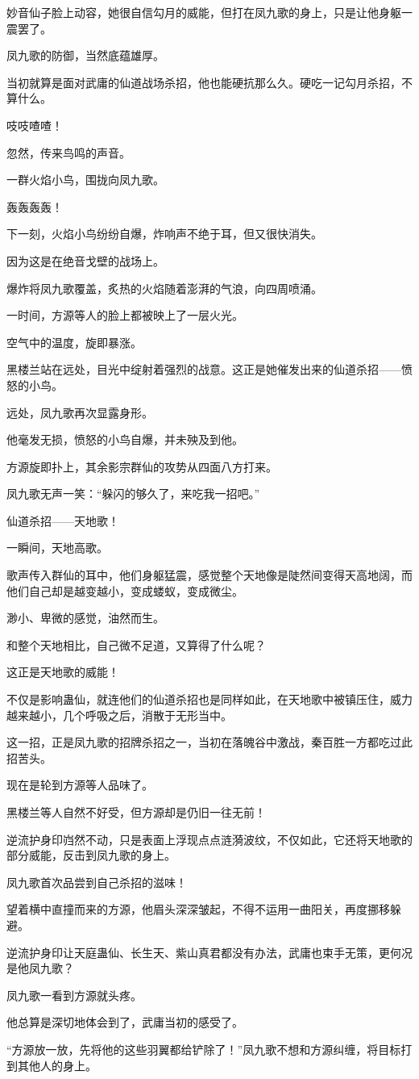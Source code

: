 \begin{this_body}
妙音仙子脸上动容，她很自信勾月的威能，但打在凤九歌的身上，只是让他身躯一震罢了。

凤九歌的防御，当然底蕴雄厚。

当初就算是面对武庸的仙道战场杀招，他也能硬抗那么久。硬吃一记勾月杀招，不算什么。

吱吱喳喳！

忽然，传来鸟鸣的声音。

一群火焰小鸟，围拢向凤九歌。

轰轰轰轰！

下一刻，火焰小鸟纷纷自爆，炸响声不绝于耳，但又很快消失。

因为这是在绝音戈壁的战场上。

爆炸将凤九歌覆盖，炙热的火焰随着澎湃的气浪，向四周喷涌。

一时间，方源等人的脸上都被映上了一层火光。

空气中的温度，旋即暴涨。

黑楼兰站在远处，目光中绽射着强烈的战意。这正是她催发出来的仙道杀招——愤怒的小鸟。

远处，凤九歌再次显露身形。

他毫发无损，愤怒的小鸟自爆，并未殃及到他。

方源旋即扑上，其余影宗群仙的攻势从四面八方打来。

凤九歌无声一笑：“躲闪的够久了，来吃我一招吧。”

仙道杀招——天地歌！

一瞬间，天地高歌。

歌声传入群仙的耳中，他们身躯猛震，感觉整个天地像是陡然间变得天高地阔，而他们自己却是越变越小，变成蝼蚁，变成微尘。

渺小、卑微的感觉，油然而生。

和整个天地相比，自己微不足道，又算得了什么呢？

这正是天地歌的威能！

不仅是影响蛊仙，就连他们的仙道杀招也是同样如此，在天地歌中被镇压住，威力越来越小，几个呼吸之后，消散于无形当中。

这一招，正是凤九歌的招牌杀招之一，当初在落魄谷中激战，秦百胜一方都吃过此招苦头。

现在是轮到方源等人品味了。

黑楼兰等人自然不好受，但方源却是仍旧一往无前！

逆流护身印岿然不动，只是表面上浮现点点涟漪波纹，不仅如此，它还将天地歌的部分威能，反击到凤九歌的身上。

凤九歌首次品尝到自己杀招的滋味！

望着横中直撞而来的方源，他眉头深深皱起，不得不运用一曲阳关，再度挪移躲避。

逆流护身印让天庭蛊仙、长生天、紫山真君都没有办法，武庸也束手无策，更何况是他凤九歌？

凤九歌一看到方源就头疼。

他总算是深切地体会到了，武庸当初的感受了。

“方源放一放，先将他的这些羽翼都给铲除了！”凤九歌不想和方源纠缠，将目标打到其他人的身上。

\end{this_body}

